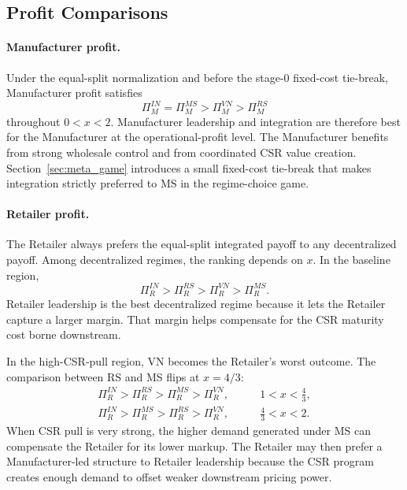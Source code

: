 \subsection{Profit Comparisons}
\label{sec:profit-comparison}

\paragraph{Manufacturer profit.}
Under the equal-split normalization and before the stage-0 fixed-cost tie-break, Manufacturer profit satisfies
\begin{equation*}
    \Pi_M^{IN}=\Pi_M^{MS}>\Pi_M^{VN}>\Pi_M^{RS}
\end{equation*}
throughout $0<x<2$. Manufacturer leadership and integration are therefore best for the Manufacturer at the operational-profit level. The Manufacturer benefits from strong wholesale control and from coordinated CSR value creation. Section~\ref{sec:meta_game} introduces a small fixed-cost tie-break that makes integration strictly preferred to MS in the regime-choice game.

\paragraph{Retailer profit.}
The Retailer always prefers the equal-split integrated payoff to any decentralized payoff. Among decentralized regimes, the ranking depends on $x$. In the baseline region,
\begin{equation*}
    \Pi_R^{IN}>\Pi_R^{RS}>\Pi_R^{VN}>\Pi_R^{MS}.
\end{equation*}
Retailer leadership is the best decentralized regime because it lets the Retailer capture a larger margin. That margin helps compensate for the CSR maturity cost borne downstream.

In the high-CSR-pull region, VN becomes the Retailer's worst outcome. The comparison between RS and MS flips at $x=4/3$:
\begin{align*}
    \Pi_R^{IN}>\Pi_R^{RS}>\Pi_R^{MS}>\Pi_R^{VN},
    \qquad &1<x<\frac43,\\
    \Pi_R^{IN}>\Pi_R^{MS}>\Pi_R^{RS}>\Pi_R^{VN},
    \qquad &\frac43<x<2.
\end{align*}
When CSR pull is very strong, the higher demand generated under MS can compensate the Retailer for its lower markup. The Retailer may then prefer a Manufacturer-led structure to Retailer leadership because the CSR program creates enough demand to offset weaker downstream pricing power.

